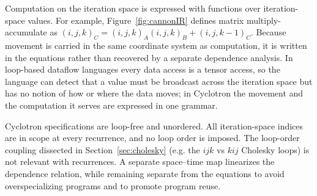 \documentclass[sigplan, nonacm]{acmart}
\begin{document}

Computation on the iteration space is expressed with functions over iteration-space values. For example, Figure~\ref{fig:cannonIR} defines matrix multiply-accumulate as
$(i,j,k)_C = (i,j,k)_A (i,j,k)_B + (i,j,k-1)_C$. Because movement is carried in the same coordinate system as computation, it is written in the equations rather than recovered by a separate dependence analysis. In loop-based dataflow languages every data access is a tensor access, so the language can detect that a value must be broadcast across the iteration space but has no notion of how or where the data moves; in Cyclotron the movement and the computation it serves are expressed in one grammar.


Cyclotron specifications are loop-free and unordered. All iteration-space indices are in scope at every recurrence, and no loop order is imposed. The loop-order coupling dissected in Section~\ref{sec:cholesky} (e.g. the $ijk$ vs $kij$ Cholesky loops) is not relevant with recurrences. A separate space--time map linearizes the dependence relation, while remaining separate from the equations to avoid overspecializing programs and to promote program reuse.
\end{document}
